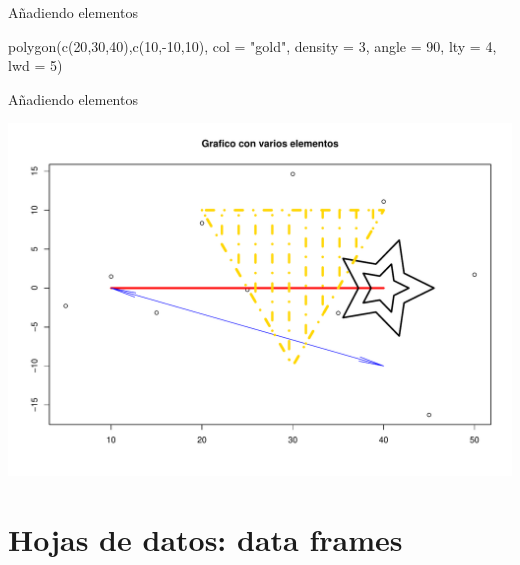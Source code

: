 \documentclass[
  ignorenonframetext,
  aspectratio=169]{beamer}
\newenvironment{Shaded}{\begin{snugshade}}{\end{snugshade}}
\newcommand{\AttributeTok}[1]{\textcolor[rgb]{0.77,0.63,0.00}{#1}}
\newcommand{\DecValTok}[1]{\textcolor[rgb]{0.00,0.00,0.81}{#1}}
\newcommand{\FunctionTok}[1]{\textcolor[rgb]{0.00,0.00,0.00}{#1}}
\newcommand{\NormalTok}[1]{#1}
\newcommand{\SpecialCharTok}[1]{\textcolor[rgb]{0.00,0.00,0.00}{#1}}
\newcommand{\StringTok}[1]{\textcolor[rgb]{0.31,0.60,0.02}{#1}}
\begin{document}
\begin{frame}[fragile]{Añadiendo elementos}
\begin{Shaded}
\begin{Highlighting}[]
\FunctionTok{polygon}\NormalTok{(}\FunctionTok{c}\NormalTok{(}\DecValTok{20}\NormalTok{,}\DecValTok{30}\NormalTok{,}\DecValTok{40}\NormalTok{),}\FunctionTok{c}\NormalTok{(}\DecValTok{10}\NormalTok{,}\SpecialCharTok{{-}}\DecValTok{10}\NormalTok{,}\DecValTok{10}\NormalTok{), }\AttributeTok{col =} \StringTok{"gold"}\NormalTok{,}
        \AttributeTok{density =} \DecValTok{3}\NormalTok{, }\AttributeTok{angle =} \DecValTok{90}\NormalTok{, }\AttributeTok{lty =} \DecValTok{4}\NormalTok{, }
        \AttributeTok{lwd =} \DecValTok{5}\NormalTok{)}
\end{Highlighting}
\end{Shaded}
\end{frame}

\begin{frame}{Añadiendo elementos}
\protect\hypertarget{auxf1adiendo-elementos-1}{}
\begin{center}\includegraphics[width=0.75\linewidth]{Hora2_files/figure-beamer/unnamed-chunk-20-1} \end{center}
\end{frame}

\hypertarget{hojas-de-datos-data-frames}{%
\section{Hojas de datos: data frames}\label{hojas-de-datos-data-frames}}
\end{document}
